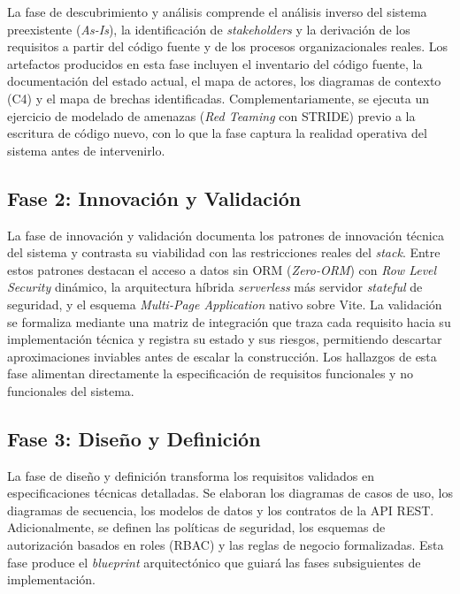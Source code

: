La fase de descubrimiento y an\'alisis comprende el an\'alisis inverso del
sistema preexistente (\textit{As-Is}), la identificaci\'on de \textit{stakeholders}
y la derivaci\'on de los requisitos a partir del c\'odigo fuente y de los procesos
organizacionales reales. Los artefactos producidos en esta fase incluyen el
inventario del c\'odigo fuente, la documentaci\'on del estado actual, el mapa de
actores, los diagramas de contexto (C4) y el mapa de brechas identificadas.
Complementariamente, se ejecuta un ejercicio de modelado de amenazas
(\textit{Red Teaming} con STRIDE) previo a la escritura de c\'odigo nuevo, con lo
que la fase captura la realidad operativa del sistema antes de intervenirlo.

\subsection{Fase 2: Innovaci\'on y Validaci\'on}
\label{subsec:fase2-innovacion}

La fase de innovaci\'on y validaci\'on documenta los patrones de innovaci\'on
t\'ecnica del sistema y contrasta su viabilidad con las restricciones reales del
\textit{stack}. Entre estos patrones destacan el acceso a datos sin ORM
(\textit{Zero-ORM}) con \textit{Row Level Security} din\'amico, la arquitectura
h\'ibrida \textit{serverless} m\'as servidor \textit{stateful} de seguridad, y el
esquema \textit{Multi-Page Application} nativo sobre Vite. La validaci\'on se
formaliza mediante una matriz de integraci\'on que traza cada requisito hacia su
implementaci\'on t\'ecnica y registra su estado y sus riesgos, permitiendo
descartar aproximaciones inviables antes de escalar la construcci\'on. Los
hallazgos de esta fase alimentan directamente la especificaci\'on de requisitos
funcionales y no funcionales del sistema.

\subsection{Fase 3: Dise\~no y Definici\'on}
\label{subsec:fase3-diseno}

La fase de dise\~no y definici\'on transforma los requisitos validados en
especificaciones t\'ecnicas detalladas. Se elaboran los diagramas de casos de
uso, los diagramas de secuencia, los modelos de datos y los contratos de la
API REST. Adicionalmente, se definen las pol\'iticas de seguridad, los
esquemas de autorizaci\'on basados en roles (RBAC) y las reglas de negocio
formalizadas. Esta fase produce el \textit{blueprint} arquitect\'onico que
guiar\'a las fases subsiguientes de implementaci\'on.

